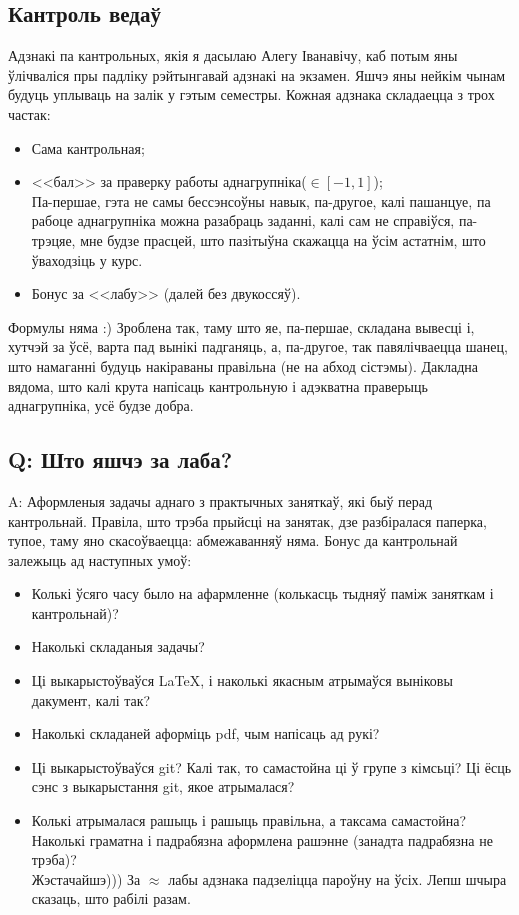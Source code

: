 	\subsection{Кантроль ведаў}
	Адзнакі па кантрольных, якія я дасылаю Алегу Іванавічу, каб потым яны ўлічваліся пры падліку рэйтынгавай адзнакі на экзамен. Яшчэ яны нейкім чынам будуць уплываць на залік у гэтым семестры. Кожная адзнака складаецца з трох частак:
	\begin{itemize}
		\item Сама кантрольная;
		\item <<бал>> за праверку работы аднагрупніка($\in [-1, 1]$); \\[6pt]
		{Па-першае, гэта не самы бессэнсоўны навык, па-другое, калі пашанцуе, па рабоце аднагрупніка можна разабраць заданні, калі сам не справіўся, па-трэцяе, мне будзе прасцей, што пазітыўна скажацца на ўсім астатнім, што ўваходзіць у курс.}
		\item Бонус за <<лабу>> (далей без двукоссяў).
	\end{itemize}
	{Формулы няма :) Зроблена так, таму што яе, па-першае, складана вывесці і, хутчэй за ўсё, варта пад вынікі падганяць, а, па-другое, так павялічваецца шанец, што намаганні будуць накіраваны правільна (не на абход сістэмы). Дакладна вядома, што калі крута напісаць кантрольную і адэкватна праверыць аднагрупніка, усё будзе добра.}
	\subsection{Q: Што яшчэ за лаба?}
	{\large A:} Аформленыя задачы аднаго з практычных заняткаў, які быў перад кантрольнай. Правіла, што трэба прыйсці на занятак, дзе разбіралася паперка, тупое, таму яно скасоўваецца: абмежаванняў няма. Бонус да кантрольнай залежыць ад наступных умоў:
	\begin{itemize}
		\item Колькі ўсяго часу было на афармленне (колькасць тыдняў паміж заняткам і кантрольнай)?
		\item Наколькі складаныя задачы?
		\item Ці выкарыстоўваўся \LaTeX, і наколькі якасным атрымаўся выніковы дакумент, калі так?
		\item Наколькі складаней аформіць pdf, чым напісаць ад рукі?
		\item Ці выкарыстоўваўся git? Калі так, то самастойна ці ў групе з кімсьці? Ці ёсць сэнс з выкарыстання git, якое атрымалася?
		\item Колькі атрымалася рашыць і рашыць правільна, а таксама самастойна? Наколькі граматна і падрабязна аформлена рашэнне (занадта падрабязна не трэба)? \\[6pt]
		{Жэстачайшэ))) За $\approx$ лабы адзнака падзеліцца пароўну на ўсіх. Лепш шчыра сказаць, што рабілі разам.}
	\end{itemize}

